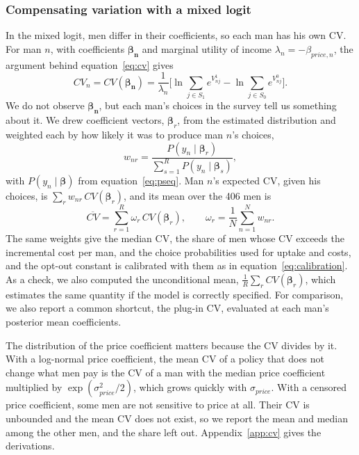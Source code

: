 \documentclass[11pt]{article}
\numberwithin{equation}{section}\numberwithin{figure}{section}\numberwithin{table}{section}
\begin{document}
\subsubsection{Compensating variation with a mixed logit}\label{sec:cvmixl}
In the mixed logit, men differ in their coefficients, so each man has his own CV. For man $n$, with coefficients $\boldsymbol{\beta_n}$ and marginal utility of income $\lambda_n = -\beta_{price,n}$, the argument behind equation~\ref{eq:cv} gives
\begin{equation}\label{eq:cvnmain}
CV_n = CV(\boldsymbol{\beta_n}) = \frac{1}{\lambda_n}\Bigg[\ln \sum_{j \in S_1} e^{V_{nj}^1} - \ln \sum_{j \in S_0} e^{V_{nj}^0}\Bigg].
\end{equation}
We do not observe $\boldsymbol{\beta_n}$, but each man's choices in the survey tell us something about it. We drew \mmcMXsimMen{} coefficient vectors, $\boldsymbol{\beta}_r$, from the estimated distribution and weighted each by how likely it was to produce man $n$'s choices,
\begin{equation}\label{eq:wmain}
w_{nr} = \frac{P(y_n \mid \boldsymbol{\beta}_r)}{\sum_{s=1}^{R} P(y_n \mid \boldsymbol{\beta}_s)},
\end{equation}
with $P(y_n \mid \boldsymbol{\beta})$ from equation~\ref{eq:pseq}. Man $n$'s expected CV, given his choices, is $\sum_r w_{nr}\, CV(\boldsymbol{\beta}_r)$, and its mean over the 406 men is
\begin{equation}\label{eq:cvbarmain}
\overline{CV} = \sum_{r=1}^{R} \omega_r\, CV(\boldsymbol{\beta}_r), \qquad \omega_r = \frac{1}{N}\sum_{n=1}^{N} w_{nr}.
\end{equation}
The same weights give the median CV, the share of men whose CV exceeds the incremental cost per man, and the choice probabilities used for uptake and costs, and the opt-out constant is calibrated with them as in equation~\ref{eq:calibration}. As a check, we also computed the unconditional mean, $\frac{1}{R}\sum_r CV(\boldsymbol{\beta}_r)$, which estimates the same quantity if the model is correctly specified. For comparison, we also report a common shortcut, the plug-in CV, evaluated at each man's posterior mean coefficients.

The distribution of the price coefficient matters because the CV divides by it. With a log-normal price coefficient, the mean CV of a policy that does not change what men pay is the CV of a man with the median price coefficient multiplied by $\exp(\sigma_{price}^2/2)$, which grows quickly with $\sigma_{price}$. With a censored price coefficient, some men are not sensitive to price at all. Their CV is unbounded and the mean CV does not exist, so we report the mean and median among the other men, and the share left out. Appendix~\ref{app:cv} gives the derivations.
\end{document}
